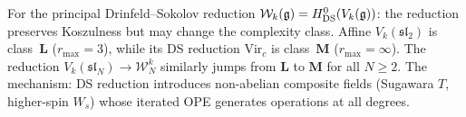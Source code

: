\begin{remark}
For the principal Drinfeld--Sokolov reduction
$\mathcal{W}_k(\mathfrak{g}) = H^0_{\mathrm{DS}}(V_k(\mathfrak{g}))$:
the reduction preserves Koszulness but may change the
complexity class. Affine $V_k(\mathfrak{sl}_2)$ is
class~$\mathbf{L}$ ($r_{\max} = 3$), while its DS reduction
$\mathrm{Vir}_c$ is class~$\mathbf{M}$ ($r_{\max} = \infty$).
The reduction $V_k(\mathfrak{sl}_N) \to \mathcal{W}_N^k$
similarly jumps from $\mathbf{L}$ to $\mathbf{M}$ for
all $N \geq 2$. The mechanism: DS reduction introduces
non-abelian composite fields (Sugawara $T$, higher-spin
$W_s$) whose iterated OPE generates operations at all
degrees.
\end{remark}

